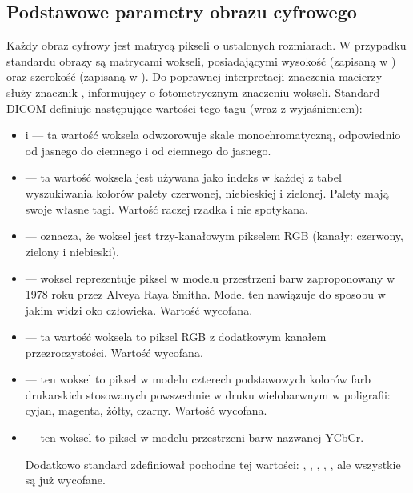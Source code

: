 \subsection{Podstawowe parametry obrazu cyfrowego}

\dicomtagExplanations

\par
Każdy obraz cyfrowy jest matrycą pikseli o ustalonych rozmiarach.
W przypadku standardu \DICOM obrazy są matrycami wokseli, posiadającymi wysokość (zapisaną w ) oraz szerokość (zapisaną w ).
Do poprawnej interpretacji znaczenia macierzy służy znacznik , informujący o fotometrycznym znaczeniu wokseli.
Standard DICOM definiuje następujące wartości tego tagu (wraz z wyjaśnieniem):
\begin{itemize}
    \item {} i  --- ta wartość woksela odwzorowuje skale monochromatyczną, odpowiednio od jasnego do ciemnego i od ciemnego do jasnego.

    \item {} --- ta wartość woksela jest używana jako indeks w każdej z tabel wyszukiwania kolorów palety czerwonej, niebieskiej i zielonej.
          Palety mają swoje własne tagi.
          Wartość raczej rzadka i nie spotykana.

    \item {} --- oznacza, że woksel jest trzy-kanałowym pikselem RGB (kanały: czerwony, zielony i niebieski).

    \item {}  --- woksel reprezentuje piksel w modelu przestrzeni barw zaproponowany w 1978 roku przez Alveya Raya Smitha.
          Model ten nawiązuje do sposobu w jakim widzi oko człowieka.
          Wartość wycofana.

    \item {} --- ta wartość woksela to piksel RGB z dodatkowym kanałem przezroczystości.
          Wartość wycofana.

    \item {} --- ten woksel to piksel w modelu czterech podstawowych kolorów farb drukarskich stosowanych powszechnie w druku wielobarwnym w poligrafii: cyjan, magenta, żółty, czarny.
          Wartość wycofana.

    \item {} --- ten woksel to piksel w modelu przestrzeni barw nazwanej YCbCr.

          Dodatkowo standard zdefiniował pochodne tej wartości: , , , , , ale wszystkie są już wycofane.
\end{itemize}


